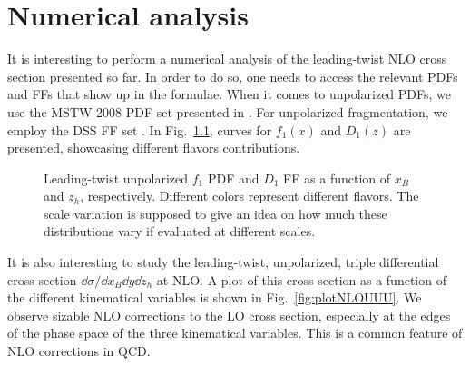 
\chapter{Numerical analysis}
It is interesting to perform a numerical analysis of the leading-twist NLO cross section presented so far. In order to do so, one needs to access the relevant PDFs and FFs that show up in the formulae. When it comes to unpolarized PDFs, we use the MSTW 2008 PDF set presented in \cite{Martin_2009}. For unpolarized fragmentation, we employ the DSS FF set \cite{de_Florian_2007}. In Fig.~\ref{fig:f1D1}, curves for $f_1(x)$ and $D_1(z)$ are presented, showcasing different flavors contributions.
\begin{figure}
    \centering
    \hfill
    \caption{Leading-twist unpolarized $f_1$ PDF and $D_1$ FF as a function of $x_B$ and $z_h$, respectively. Different colors represent different flavors. The scale variation is supposed to give an idea on how much these distributions vary if evaluated at different scales.}
    \label{fig:f1D1}
\end{figure}
It is also interesting to study the leading-twist, unpolarized, triple differential cross section $\dd \sigma/\dd x_B \dd y \dd z_h$ at NLO. A plot of this cross section as a function of the different kinematical variables is shown in Fig.~\ref{fig:plotNLOUUU}. We observe sizable NLO corrections to the LO cross section, especially at the edges of the phase space of the three kinematical variables. This is a common feature of NLO corrections in QCD.
